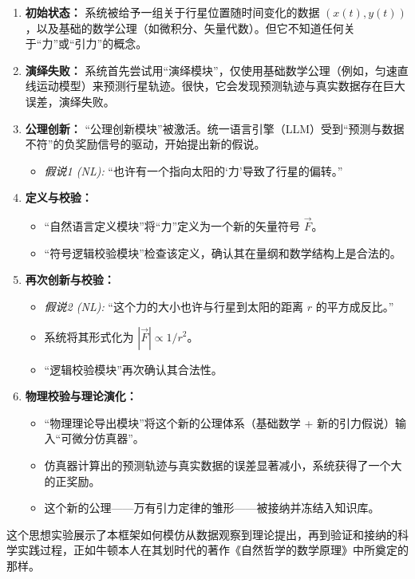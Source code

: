 \documentclass[11pt, a4paper]{article}
\begin{document}
\begin{enumerate}
	\item \textbf{初始状态：} 系统被给予一组关于行星位置随时间变化的数据 $(x(t), y(t))$，以及基础的数学公理（如微积分、矢量代数）。但它不知道任何关于“力”或“引力”的概念。
	
	\item \textbf{演绎失败：} 系统首先尝试用“演绎模块”，仅使用基础数学公理（例如，匀速直线运动模型）来预测行星轨迹。很快，它会发现预测轨迹与真实数据存在巨大误差，演绎失败。
	
	\item \textbf{公理创新：} “公理创新模块”被激活。统一语言引擎（LLM）受到“预测与数据不符”的负奖励信号的驱动，开始提出新的假说。
	\begin{itemize}
		\item \textit{假说1 (NL):} “也许有一个指向太阳的‘力’导致了行星的偏转。”
	\end{itemize}
	
	\item \textbf{定义与校验：}
	\begin{itemize}
		\item “自然语言定义模块”将“力”定义为一个新的矢量符号 $\vec{F}$。
		\item “符号逻辑校验模块”检查该定义，确认其在量纲和数学结构上是合法的。
	\end{itemize}
	
	\item \textbf{再次创新与校验：}
	\begin{itemize}
		\item \textit{假说2 (NL):} “这个力的大小也许与行星到太阳的距离 $r$ 的平方成反比。”
		\item 系统将其形式化为 $|\vec{F}| \propto 1/r^2$。
		\item “逻辑校验模块”再次确认其合法性。
	\end{itemize}
	
	\item \textbf{物理校验与理论演化：}
	\begin{itemize}
		\item “物理理论导出模块”将这个新的公理体系（基础数学 + 新的引力假说）输入“可微分仿真器”。
		\item 仿真器计算出的预测轨迹与真实数据的误差显著减小，系统获得了一个大的正奖励。
		\item 这个新的公理——万有引力定律的雏形——被接纳并冻结入知识库。
	\end{itemize}
\end{enumerate}
这个思想实验展示了本框架如何模仿从数据观察到理论提出，再到验证和接纳的科学实践过程，正如牛顿本人在其划时代的著作《自然哲学的数学原理》中所奠定的那样\citep{newton1687principia}。
\end{document}

